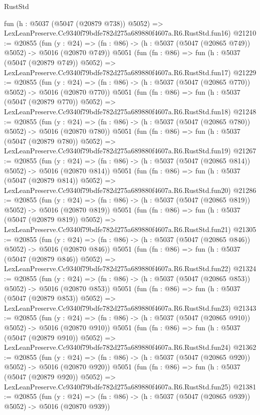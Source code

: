\begin{lexlean}{RustStd}
\begin{coremodule}
    fun (h : @5037 (@5047 (@20879 @738)) @5052) =>
    LexLeanPreserve.Cc9340f79bdfe782d275a689880f4607a.R6.RustStd.fun16)
@21210 := @20855
    (fun (y : @24) => (fn : @86) -> (h : @5037 (@5047 (@20865 @749)) @5052) -> @5016 (@20870 @749))
    @5051
    (fun (fn : @86) =>
    fun (h : @5037 (@5047 (@20879 @749)) @5052) =>
    LexLeanPreserve.Cc9340f79bdfe782d275a689880f4607a.R6.RustStd.fun17)
@21229 := @20855
    (fun (y : @24) => (fn : @86) -> (h : @5037 (@5047 (@20865 @770)) @5052) -> @5016 (@20870 @770))
    @5051
    (fun (fn : @86) =>
    fun (h : @5037 (@5047 (@20879 @770)) @5052) =>
    LexLeanPreserve.Cc9340f79bdfe782d275a689880f4607a.R6.RustStd.fun18)
@21248 := @20855
    (fun (y : @24) => (fn : @86) -> (h : @5037 (@5047 (@20865 @780)) @5052) -> @5016 (@20870 @780))
    @5051
    (fun (fn : @86) =>
    fun (h : @5037 (@5047 (@20879 @780)) @5052) =>
    LexLeanPreserve.Cc9340f79bdfe782d275a689880f4607a.R6.RustStd.fun19)
@21267 := @20855
    (fun (y : @24) => (fn : @86) -> (h : @5037 (@5047 (@20865 @814)) @5052) -> @5016 (@20870 @814))
    @5051
    (fun (fn : @86) =>
    fun (h : @5037 (@5047 (@20879 @814)) @5052) =>
    LexLeanPreserve.Cc9340f79bdfe782d275a689880f4607a.R6.RustStd.fun20)
@21286 := @20855
    (fun (y : @24) => (fn : @86) -> (h : @5037 (@5047 (@20865 @819)) @5052) -> @5016 (@20870 @819))
    @5051
    (fun (fn : @86) =>
    fun (h : @5037 (@5047 (@20879 @819)) @5052) =>
    LexLeanPreserve.Cc9340f79bdfe782d275a689880f4607a.R6.RustStd.fun21)
@21305 := @20855
    (fun (y : @24) => (fn : @86) -> (h : @5037 (@5047 (@20865 @846)) @5052) -> @5016 (@20870 @846))
    @5051
    (fun (fn : @86) =>
    fun (h : @5037 (@5047 (@20879 @846)) @5052) =>
    LexLeanPreserve.Cc9340f79bdfe782d275a689880f4607a.R6.RustStd.fun22)
@21324 := @20855
    (fun (y : @24) => (fn : @86) -> (h : @5037 (@5047 (@20865 @853)) @5052) -> @5016 (@20870 @853))
    @5051
    (fun (fn : @86) =>
    fun (h : @5037 (@5047 (@20879 @853)) @5052) =>
    LexLeanPreserve.Cc9340f79bdfe782d275a689880f4607a.R6.RustStd.fun23)
@21343 := @20855
    (fun (y : @24) => (fn : @86) -> (h : @5037 (@5047 (@20865 @910)) @5052) -> @5016 (@20870 @910))
    @5051
    (fun (fn : @86) =>
    fun (h : @5037 (@5047 (@20879 @910)) @5052) =>
    LexLeanPreserve.Cc9340f79bdfe782d275a689880f4607a.R6.RustStd.fun24)
@21362 := @20855
    (fun (y : @24) => (fn : @86) -> (h : @5037 (@5047 (@20865 @920)) @5052) -> @5016 (@20870 @920))
    @5051
    (fun (fn : @86) =>
    fun (h : @5037 (@5047 (@20879 @920)) @5052) =>
    LexLeanPreserve.Cc9340f79bdfe782d275a689880f4607a.R6.RustStd.fun25)
@21381 := @20855
    (fun (y : @24) => (fn : @86) -> (h : @5037 (@5047 (@20865 @939)) @5052) -> @5016 (@20870 @939))

\end{coremodule}
\end{lexlean}
